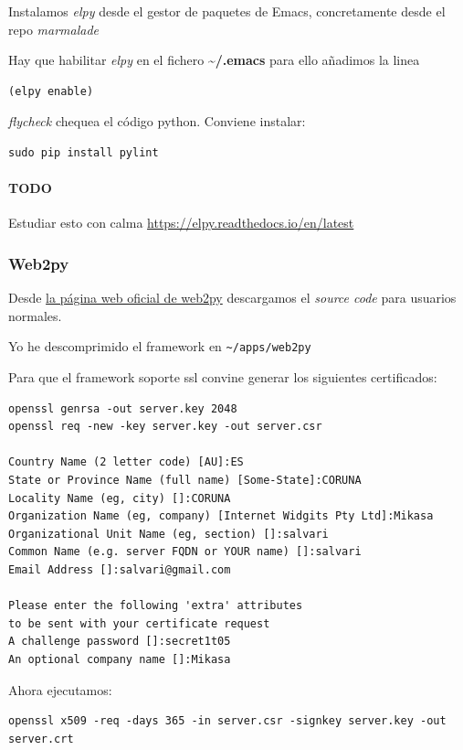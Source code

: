 \documentclass[12pt,spanish,]{scrartcl}
\let\oldparagraph\paragraph
\renewcommand{\paragraph}[1]{\oldparagraph{#1}\mbox{}}
\begin{document}
Instalamos \emph{elpy} desde el gestor de paquetes de Emacs,
concretamente desde el repo \emph{marmalade}

Hay que habilitar \emph{elpy} en el fichero
\textbf{\textasciitilde{}/.emacs} para ello añadimos la linea

\begin{verbatim}
(elpy enable)
\end{verbatim}

\emph{flycheck} chequea el código python. Conviene instalar:

\begin{verbatim}
sudo pip install pylint
\end{verbatim}

\paragraph{TODO}\label{todo}

Estudiar esto con calma \url{https://elpy.readthedocs.io/en/latest}

\subsubsection{Web2py}\label{web2py}

Desde \href{http://www.web2py.com}{la página web oficial de web2py}
descargamos el \emph{source code} para usuarios normales.

Yo he descomprimido el framework en
\texttt{\textasciitilde{}/apps/web2py}

Para que el framework soporte ssl convine generar los siguientes
certificados:

\begin{verbatim}
openssl genrsa -out server.key 2048
openssl req -new -key server.key -out server.csr

Country Name (2 letter code) [AU]:ES
State or Province Name (full name) [Some-State]:CORUNA
Locality Name (eg, city) []:CORUNA
Organization Name (eg, company) [Internet Widgits Pty Ltd]:Mikasa
Organizational Unit Name (eg, section) []:salvari
Common Name (e.g. server FQDN or YOUR name) []:salvari
Email Address []:salvari@gmail.com

Please enter the following 'extra' attributes
to be sent with your certificate request
A challenge password []:secret1t05
An optional company name []:Mikasa
\end{verbatim}

Ahora ejecutamos:

\begin{verbatim}
openssl x509 -req -days 365 -in server.csr -signkey server.key -out server.crt
\end{verbatim}
\end{document}
